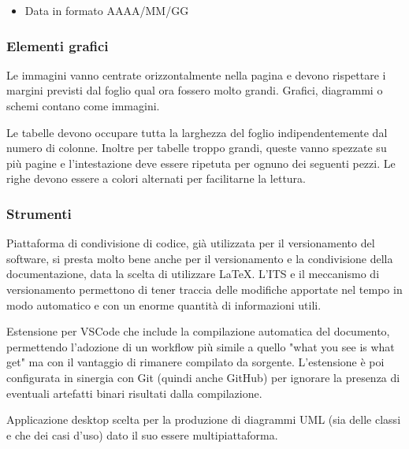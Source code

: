     \begin{itemize}
    \item Data in formato AAAA/MM/GG %
    \end{itemize}

\subsubsection{Elementi grafici}

    Le immagini vanno centrate orizzontalmente nella pagina e devono rispettare i margini previsti dal foglio qual ora
    fossero molto grandi.
    Grafici, diagrammi o schemi contano come immagini.

    Le tabelle devono occupare tutta la larghezza del foglio indipendentemente dal numero di colonne.
    Inoltre per tabelle troppo grandi, queste vanno spezzate su più pagine e l'intestazione deve essere ripetuta
    per ognuno dei seguenti pezzi.
    Le righe devono essere a colori alternati per facilitarne la lettura.

\subsubsection{Strumenti}

    Piattaforma di condivisione di codice, già utilizzata per il versionamento del software, si presta
    molto bene anche per il versionamento e la condivisione della documentazione, data la scelta di utilizzare \LaTeX.
    L'ITS e il meccanismo di versionamento permettono di tener traccia delle modifiche apportate nel tempo
    in modo automatico e con un enorme quantità di informazioni utili.

    Estensione per VSCode che include la compilazione automatica del documento, permettendo l'adozione di un workflow più simile
    a quello "what you see is what get" ma con il vantaggio di rimanere compilato da sorgente.
    L'estensione è poi configurata in sinergia con Git (quindi anche GitHub) per ignorare la presenza di eventuali artefatti binari
    risultati dalla compilazione.

    Applicazione desktop scelta per la produzione di diagrammi UML (sia delle classi e che dei casi d'uso) dato il suo essere
    multipiattaforma.
